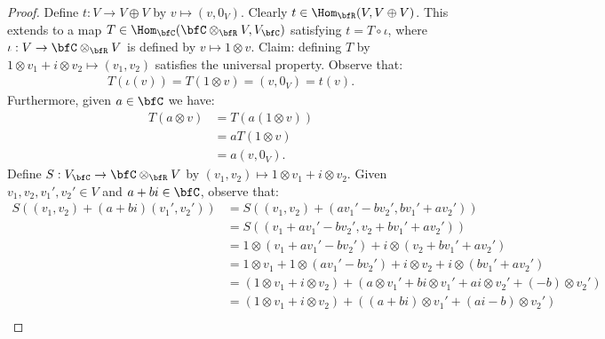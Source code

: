 \documentclass[10pt,twoside,openany]{memoir}
\begin{document}
        \begin{proof}
            Define $t:V \rightarrow V \oplus V$ by $v \mapsto (v,0_V)$. Clearly $t \in \Hom_\bfR(V, V \oplus V)$. This extends to a map $T \in \Hom_\bfC(\bfC \otimes_\bfR V, V_\bfC)$ satisfying $t = T \circ \iota$, where $\iota:V \rightarrow \bfC \otimes_\bfR V$ is defined by $v \mapsto 1 \otimes v$. Claim: defining $T$ by $1 \otimes v_1 + i \otimes v_2 \mapsto (v_1,v_2)$ satisfies the universal property. Observe that:
                \begin{equation*}
                \begin{split}
                    T(\iota(v)) = T(1 \otimes v) = (v,0_V) = t(v).
                \end{split}
                \end{equation*}
            Furthermore, given $a \in \bfC$ we have:
                \begin{equation*}
                \begin{split}
                    T(a \otimes v)
                    & = T(a (1 \otimes v)) \\
                    & = aT(1 \otimes v) \\
                    & = a(v,0_V).
                \end{split}
                \end{equation*}
            Define $S: V_\bfC \rightarrow \bfC \otimes_\bfR V$ by $(v_1,v_2) \mapsto 1 \otimes v_1 + i \otimes v_2$. Given $v_1,v_2,v_1',v_2' \in V$ and $a+bi \in \bfC$, observe that:
                \begin{equation*}
                \begin{split}
                    S((v_1,v_2)+(a+bi)(v_1',v_2'))
                    & = S((v_1,v_2) + (av_1' - bv_2',bv_1' + av_2')) \\
                    & = S((v_1 + av_1' - bv_2',v_2 + bv_1' + av_2')) \\
                    & = 1 \otimes (v_1 + av_1' - bv_2') + i \otimes (v_2 + bv_1' + av_2') \\
                    & = 1 \otimes v_1 + 1 \otimes (av_1' - bv_2') + i \otimes v_2 + i \otimes (bv_1' + av_2')\\
                    & = (1\otimes v_1 + i \otimes v_2) + (a \otimes v_1' + bi \otimes v_1' + ai\otimes v_2' + (-b)\otimes v_2') \\
                    & = (1\otimes v_1 + i \otimes v_2) + ((a+bi) \otimes v_1' + (ai-b) \otimes v_2') \\

\end{split}
\end{equation*}
\end{proof}
\end{document}
